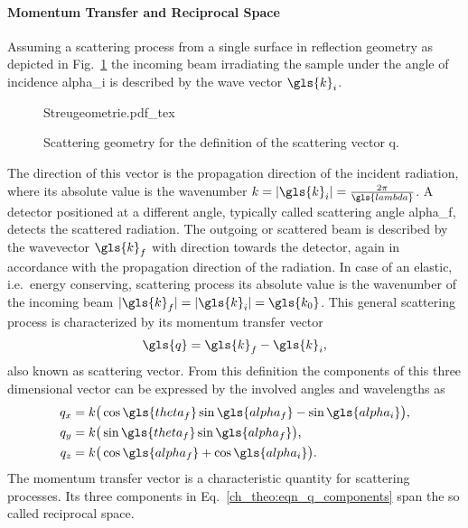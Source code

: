 \paragraph{Momentum Transfer and Reciprocal Space}
Assuming a scattering process from a single surface in reflection geometry as depicted in Fig.~\ref{ch_theo:fig_scattering_process} the incoming beam irradiating the sample under the angle of incidence \gls{alpha_i} is described by the wave vector $\gls{k}_i$.
\begin{figure}[htb]
    {Streugeometrie.pdf_tex}
    \caption{Scattering geometry for the definition of the scattering vector \gls{q}.}
    \label{ch_theo:fig_scattering_process}
\end{figure}
The direction of this vector is the propagation direction of the incident radiation, where its absolute value is the wavenumber $k = |\gls{k}_i| = \frac{2 \pi}{\gls{lambda}}$. A detector positioned at a different angle, typically called scattering angle \gls{alpha_f}, detects the scattered radiation. The outgoing or scattered beam is described by the wavevector $\gls{k}_f$ with direction towards the detector, again in accordance with the propagation direction of the radiation. In case of an elastic, i.e.~energy conserving, scattering process its absolute value is the wavenumber of the incoming beam $|\gls{k}_f| = |\gls{k}_i| = \gls{k_0}$. This general scattering process is characterized by its momentum transfer vector 
\begin{align}
\gls{q} = \gls{k}_f - \gls{k}_i\text{,} \label{ch:theo_eqn:q}
\end{align}
also known as scattering vector. From this definition the components of this three dimensional vector can be expressed by the involved angles and wavelengths as
\begin{align}\begin{split}
q_x &= k \big( \cos \gls{theta_f} \sin \gls{alpha_f} - \sin \gls{alpha_i}\big)\text{,}\\
q_y &= k \big( \sin \gls{theta_f} \sin \gls{alpha_f}\big)\text{,}\\
q_z &= k \big( \cos \gls{alpha_f} + \cos \gls{alpha_i}\big)\text{.}
\end{split} \label{ch_theo:eqn_q_components}
\end{align}
The momentum transfer vector is a characteristic quantity for scattering processes. Its three components in Eq.~\eqref{ch_theo:eqn_q_components} span the so called reciprocal space.

